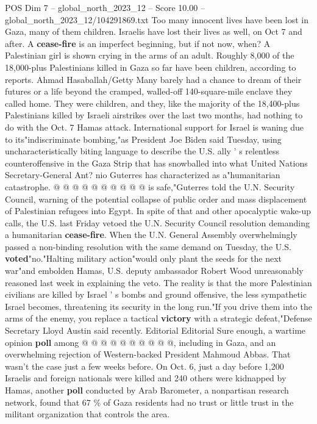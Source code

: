 \begin{textsample}{POS Dim 7 – global\_north\_2023\_12 – Score 10.00 – global\_north\_2023\_12/104291869.txt}  \label{ex:f7_pos_149}
Too many innocent lives have been lost in Gaza, many of them children.
Israelis have lost their lives as well, on Oct 7 and after.
A \textbf{cease-fire} is an imperfect beginning, but if not now, when?
A Palestinian girl is shown crying in the arms of an adult.
Roughly 8,000 of the 18,000-plus Palestinians killed in Gaza so far have been children, according to reports.
Ahmad Hasaballah/Getty Many barely had a chance to dream of their futures or a life beyond the cramped, walled-off 140-square-mile enclave they called home.
They were children, and they, like the majority of the 18,400-plus Palestinians killed by Israeli airstrikes over the last two months, had nothing to do with the Oct. 7 Hamas attack.
International support for Israel is waning due to its"indiscriminate bombing,"as President Joe Biden said Tuesday, using uncharacteristically biting language to describe the U.S. ally ' s relentless counteroffensive in the Gaza Strip that has snowballed into what United Nations Secretary-General Ant? nio Guterres has characterized as a"humanitarian catastrophe. @ @ @ @ @ @ @ @ @ @ is safe,"Guterres told the U.N.
Security Council, warning of the potential collapse of public order and mass displacement of Palestinian refugees into Egypt.
In spite of that and other apocalyptic wake-up calls, the U.S. last Friday vetoed the U.N.
Security Council resolution demanding a humanitarian \textbf{cease-fire}.
When the U.N.
General Assembly overwhelmingly passed a non-binding resolution with the same demand on Tuesday, the U.S. \textbf{voted}"no."Halting military action"would only plant the seeds for the next war"and embolden Hamas, U.S. deputy ambassador Robert Wood unreasonably reasoned last week in explaining the veto.
The reality is that the more Palestinian civilians are killed by Israel ' s bombs and ground offensive, the less sympathetic Israel becomes, threatening its security in the long run."If you drive them into the arms of the enemy, you replace a tactical \textbf{victory} with a strategic defeat,"Defense Secretary Lloyd Austin said recently.
Editorial Editorial Sure enough, a wartime opinion \textbf{poll} among @ @ @ @ @ @ @ @ @ @, including in Gaza, and an overwhelming rejection of Western-backed President Mahmoud Abbas.
That wasn't the case just a few weeks before.
On Oct. 6, just a day before 1,200 Israelis and foreign nationals were killed and 240 others were kidnapped by Hamas, another \textbf{poll} conducted by Arab Barometer, a nonpartisan research network, found that 67 \% of Gaza residents had no trust or little trust in the militant organization that controls the area.

\end{textsample}
